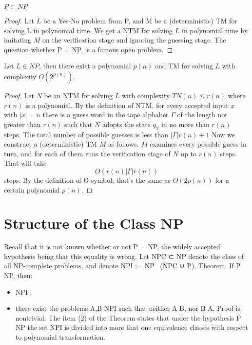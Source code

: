 \begin{theorem}
    $P \subset NP$
\end{theorem}
\begin{proof}
    Let $L$ be a Yes-No problem from P,
    and M be a (deterministic) TM for solving L in polynomial time.
    We get a NTM for solving $L$ in polynomial time by imitating $M$ on the verification stage
    and ignoring the guessing stage.
    The question whether P = NP, is a famous open problem.
\end{proof}

\begin{theorem}
    Let $L \in NP$,
    then there exist a polynomial $p(n)$ and TM for solving $L$ with complexity $O(2^{p(n)})$.
\end{theorem}
\begin{proof}
    Let $N$ be an NTM for solving $L$ with complexity $TN (n) \leq r(n)$
    where $r(n)$ is a polynomial.
    By the definition of NTM, for every accepted input $x$ with $|x| = n$
    there is a guess word in the tape alphabet $\Gamma$ of the length not greater than $r(n)$
    such that $N$ adopts the state $q_Y$ in no more than $r(n)$ steps.
    The total number of possible guesses is less than $|\Gamma|r(n)+1$
    Now we construct a (deterministic) TM $M$ as follows.
    $M$ examines every possible guess in turn,
    and for each of them runs the verification stage of $N$ up to $r(n)$ steps.
    That will take $$O(r(n)|\Gamma|r(n))$$ steps.
    By the definition of O-symbol, that’s the same as $O(2p(n))$ for a certain polynomial $p(n)$.
\end{proof}

\section{Structure of the Class NP}
Recall that it is not known whether or not P = NP, the widely accepted hypothesis being that this equality is wrong.
Let NPC ⊂ NP denote the class of all NP-complete problems,
and denote NPI := NP \ (NPC ∪ P).
Theorem. If P \neq NP, then:
\begin{itemize}
    \item NPI \neq \varnothing;
    \item there exist the problems A,B \in NPI such that neither A \propto B, nor B \propto A.
        Proof is nontrivial.
        The item (2) of the Theorem states that under the hypothesis P \neq NP the set NPI is divided into more that one equivalence classes with respect to polynomial transformation.
\end{itemize}

